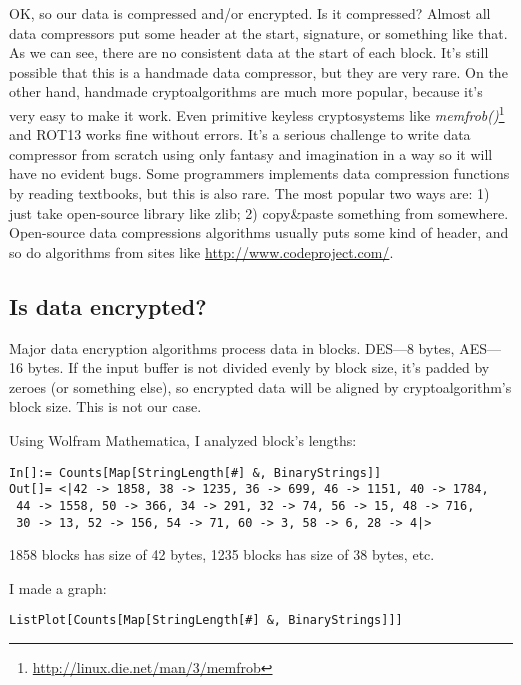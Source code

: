 OK, so our data is compressed and/or encrypted.
Is it compressed? Almost all data compressors put some header at the start, signature, or something like that.
As we can see, there are no consistent data at the start of each block.
It's still possible that this is a handmade data compressor, but they are very rare.
On the other hand, handmade cryptoalgorithms are much more popular, because it's very easy to make it work.
Even primitive keyless cryptosystems like \emph{memfrob()}\footnote{\url{http://linux.die.net/man/3/memfrob}}
and ROT13 works fine without errors.
It's a serious challenge to write data compressor from scratch using only fantasy and imagination in a way so it will have no evident bugs.
Some programmers implements data compression functions by reading textbooks, but this is also rare.
The most popular two ways are:
1) just take open-source library like zlib;
2) copy\&paste something from somewhere.
Open-source data compressions algorithms usually puts some kind of header, and so do
algorithms from sites like \url{http://www.codeproject.com/}.

\subsection{Is data encrypted?}

Major data encryption algorithms process data in blocks. DES---8 bytes, AES---16 bytes.
If the input buffer is not divided evenly by block size, it's padded by zeroes (or something else),
so encrypted data will be aligned by cryptoalgorithm's block size.
This is not our case.

Using Wolfram Mathematica, I analyzed block's lengths:

\begin{lstlisting}
In[]:= Counts[Map[StringLength[#] &, BinaryStrings]]
Out[]= <|42 -> 1858, 38 -> 1235, 36 -> 699, 46 -> 1151, 40 -> 1784,
 44 -> 1558, 50 -> 366, 34 -> 291, 32 -> 74, 56 -> 15, 48 -> 716,
 30 -> 13, 52 -> 156, 54 -> 71, 60 -> 3, 58 -> 6, 28 -> 4|>
\end{lstlisting}

1858 blocks has size of 42 bytes, 1235 blocks has size of 38 bytes, etc.

I made a graph:

\begin{lstlisting}
ListPlot[Counts[Map[StringLength[#] &, BinaryStrings]]]
\end{lstlisting}


